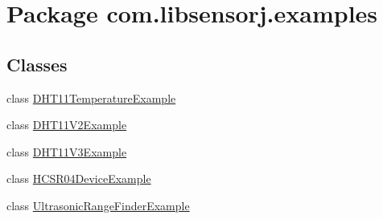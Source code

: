 \hypertarget{namespacecom_1_1libsensorj_1_1examples}{}\section{Package com.\+libsensorj.\+examples}
\label{namespacecom_1_1libsensorj_1_1examples}
\subsection*{Classes}
\begin{DoxyCompactItemize}
\item 
class \hyperlink{classcom_1_1libsensorj_1_1examples_1_1DHT11TemperatureExample}{D\+H\+T11\+Temperature\+Example}
\item 
class \hyperlink{classcom_1_1libsensorj_1_1examples_1_1DHT11V2Example}{D\+H\+T11\+V2\+Example}
\item 
class \hyperlink{classcom_1_1libsensorj_1_1examples_1_1DHT11V3Example}{D\+H\+T11\+V3\+Example}
\item 
class \hyperlink{classcom_1_1libsensorj_1_1examples_1_1HCSR04DeviceExample}{H\+C\+S\+R04\+Device\+Example}
\item 
class \hyperlink{classcom_1_1libsensorj_1_1examples_1_1UltrasonicRangeFinderExample}{Ultrasonic\+Range\+Finder\+Example}
\end{DoxyCompactItemize}
